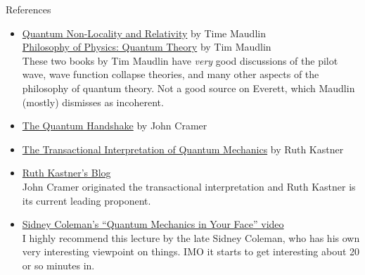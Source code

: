\documentclass[9pt,usenames,dvipsnames]{beamer}
\begin{document}
\begin{frame}[t]{References}
\vspace{0pt}
\begin{itemize}

\item \href{https://www.barnesandnoble.com/w/quantum-non-locality-and-relativity-tim-maudlin/1100226576?ean=9781444331271}{Quantum Non-Locality and Relativity} by Time Maudlin\\
    \href{https://www.barnesandnoble.com/w/philosophy-of-physics-tim-maudlin/1128567493?ean=9780691183527}{Philosophy of Physics: Quantum Theory} by Tim Maudlin\\
    These two books by Tim Maudlin have {\it very} good discussions of the pilot wave, wave function collapse theories, and many other aspects of the philosophy of quantum theory. Not a good source on Everett, which Maudlin (mostly) dismisses as incoherent.

\vspace{8pt}
\item \href{https://www.goodreads.com/book/show/26362020-the-quantum-handshake?ac=1&from_search=true&qid=Tta3kWOxqK&rank=1}{The Quantum Handshake} by John Cramer

\vspace{0pt}
\item \href{https://www.goodreads.com/book/show/24509073-the-transactional-interpretation-of-quantum-mechanics?ac=1&from_search=true&qid=CrasunyOEg&rank=1}{The Transactional Interpretation of Quantum Mechanics} by Ruth Kastner

\vspace{0pt}
\item \href{https://transactionalinterpretation.org/}{Ruth Kastner's Blog}
\vspace{2pt}\\
    John Cramer originated the transactional interpretation and Ruth Kastner is its current leading proponent. 

\vspace{8pt}
\item \href{http://media.physics.harvard.edu/video/?id=SidneyColeman_QMIYF}{Sidney Coleman’s “Quantum Mechanics in Your Face” video}\\
    I highly recommend this lecture by the late Sidney Coleman, who has his own very interesting viewpoint on things. IMO it starts to get interesting about 20 or so minutes in.

\end{itemize}
\end{frame}
\end{document}
